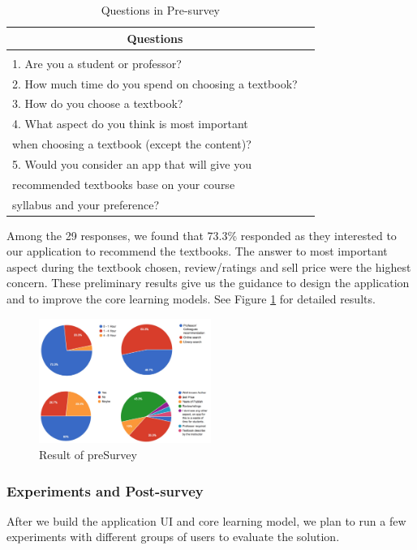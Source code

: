 \begin{table}[ht] 
\caption{Questions in Pre-survey}
\label{Pre-survey}
\begin{center}
\begin{tabular}{ll}
\multicolumn{1}{c}{\bf Questions} 
\\ \hline \\
1. Are you a student or professor?\\
2. How much time do you spend on choosing a textbook?\\
3. How do you choose a textbook?\\
4. What aspect do you think is most important\\
when choosing a textbook (except the content)? \\
5. Would you consider an app that will give you \\
recommended textbooks base on your course \\
syllabus and your preference? \\
\end{tabular}
\end{center}
\end{table}
Among the 29 responses, we found that 73.3\% responded as they interested to our application to recommend the textbooks. The answer to most important aspect during the textbook chosen, review/ratings and sell price were the highest concern. These preliminary results give us the guidance to design the application and to improve the core learning models. See Figure \ref{result_of_presurvey} for detailed results.

\begin{figure}[ht]
\caption{Result of preSurvey}
\label{result_of_presurvey}
\centering
\includegraphics[width=0.5\textwidth]{preSurvey.jpeg}
\end{figure}

\subsubsection{Experiments and Post-survey}
After we build the application UI and core learning model, we plan to run a few experiments with different groups of users to evaluate the solution.

